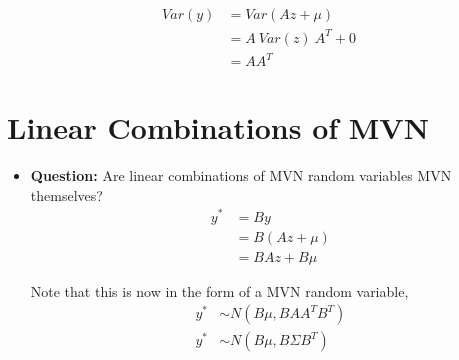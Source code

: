 \documentclass[12pt]{article}
\begin{document}
\begin{align*}
 Var(y) &= Var(Az + \mu) \\
		&= A\ Var(z)\ A^T + 0 \\
		&= AA^T
\end{align*}

\newpage

\section{Linear Combinations of MVN}
\begin{itemize}
	\item \textbf{Question:} Are linear combinations of MVN random variables MVN themselves?
	\begin{align*}
	y^* &= By \\
	&= B(Az + \mu) \\
	&= BAz + B \mu
	\end{align*}
	
	Note that this is now in the form of a MVN random variable,
	\begin{align*}
	y^* &\sim N(B\mu, B A A^T B^T) \\
	y^* &\sim N(B\mu, B \Sigma B^T)
	\end{align*}	
\end{itemize}

\newpage
\end{document}
